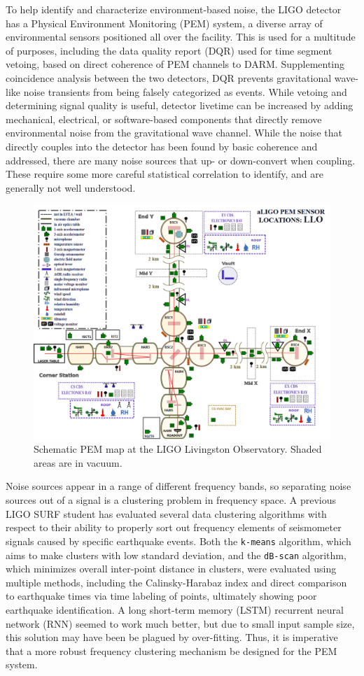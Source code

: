 \documentclass[colorlinks=true,pdfstartview=FitV,linkcolor=blue,
            citecolor=red,urlcolor=magenta]{ligodoc}
\begin{document}
To help identify and characterize environment-based noise, the LIGO detector has a Physical Environment Monitoring (PEM) system, a diverse array of environmental sensors positioned all over the facility.
This is used for a multitude of purposes, including the data quality report (DQR) used for time segment vetoing, based on direct coherence of PEM channels to DARM.
Supplementing coincidence analysis between the two detectors, DQR prevents gravitational wave-like noise transients from being falsely categorized as events.
While vetoing and determining signal quality is useful, detector livetime can be increased by adding mechanical, electrical, or software-based components that directly remove environmental noise from the gravitational wave channel.
While the noise that directly couples into the detector has been found by basic coherence and addressed, there are many noise sources that up- or down-convert when coupling.
These require some more careful statistical correlation to identify, and are generally not well understood.
\begin{figure}
\includegraphics[width=\textwidth]{llopem.png}
\caption{Schematic PEM map at the LIGO Livingston Observatory. Shaded areas are in vacuum.}
\end{figure}

Noise sources appear in a range of different frequency bands, so separating noise sources out of a signal is a clustering problem in frequency space.
A previous LIGO SURF student has evaluated several data clustering algorithms with respect to their ability to properly sort out frequency elements of seismometer signals caused by specific earthquake events\cite{roxana}.
Both the \texttt{k-means} algorithm, which aims to make clusters with low standard deviation, and the \texttt{dB-scan} algorithm, which minimizes overall inter-point distance in clusters, were evaluated using multiple methods, including the Calinsky-Harabaz  index and direct comparison to earthquake times via time labeling of points, ultimately showing poor earthquake identification.
A long short-term memory (LSTM) recurrent neural network (RNN) seemed to work much better, but due to small input sample size, this solution may have been be plagued by over-fitting.
Thus, it is imperative that a more robust frequency clustering mechanism be designed for the PEM system.
\end{document}
